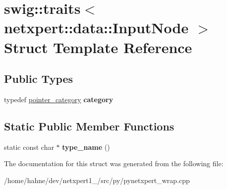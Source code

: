 \hypertarget{structswig_1_1traits_3_01netxpert_1_1data_1_1InputNode_01_4}{}\section{swig\+:\+:traits$<$ netxpert\+:\+:data\+:\+:Input\+Node $>$ Struct Template Reference}
\label{structswig_1_1traits_3_01netxpert_1_1data_1_1InputNode_01_4}
\subsection*{Public Types}
\begin{DoxyCompactItemize}
\item 
typedef \hyperlink{structswig_1_1pointer__category}{pointer\+\_\+category} {\bfseries category}\hypertarget{structswig_1_1traits_3_01netxpert_1_1data_1_1InputNode_01_4_a074fd1732d1cab9e8670a03861d2e1b3}{}\label{structswig_1_1traits_3_01netxpert_1_1data_1_1InputNode_01_4_a074fd1732d1cab9e8670a03861d2e1b3}

\end{DoxyCompactItemize}
\subsection*{Static Public Member Functions}
\begin{DoxyCompactItemize}
\item 
static const char $\ast$ {\bfseries type\+\_\+name} ()\hypertarget{structswig_1_1traits_3_01netxpert_1_1data_1_1InputNode_01_4_a5b181e6b3ddd2f393e99220e8a3bc3a6}{}\label{structswig_1_1traits_3_01netxpert_1_1data_1_1InputNode_01_4_a5b181e6b3ddd2f393e99220e8a3bc3a6}

\end{DoxyCompactItemize}


The documentation for this struct was generated from the following file\+:\begin{DoxyCompactItemize}
\item 
/home/hahne/dev/netxpert1\+\_/src/py/pynetxpert\+\_\+wrap.\+cpp\end{DoxyCompactItemize}
